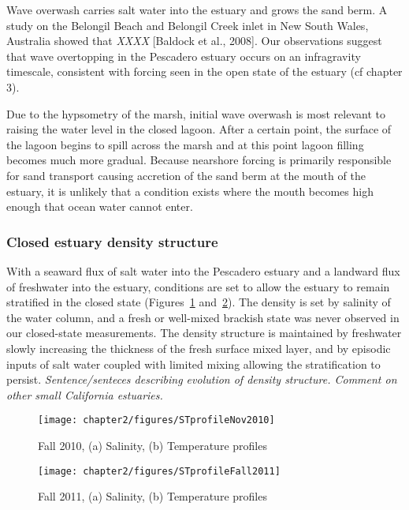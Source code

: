 Wave overwash carries salt water into the estuary and grows the sand berm. A study on the Belongil Beach and Belongil Creek inlet in New South Wales, Australia showed that \emph{XXXX} [Baldock et al., 2008]. Our observations suggest that wave overtopping in the Pescadero 
estuary occurs on an infragravity timescale, consistent with forcing seen in the open state of the estuary (cf chapter 3).

Due to the hypsometry of the marsh, initial wave overwash is most relevant to raising the water level in the closed lagoon. After a certain point, the surface of the lagoon begins to spill across the marsh and at this point lagoon filling becomes much more gradual. Because nearshore forcing is primarily responsible for sand transport causing accretion of the sand berm at the mouth of the estuary, it is unlikely that a condition exists where the mouth becomes high enough that ocean water cannot enter. 


\subsubsection{Closed estuary density structure} \label{cl_strat}

With a seaward flux of salt water into the Pescadero estuary and a landward flux of freshwater into the estuary, conditions are set to allow the estuary to remain stratified in the closed state (Figures~\ref{fig:profNov2010} and~\ref{fig:profFall2011}). The density is set by salinity of the water column, and a fresh or well-mixed brackish state was never observed in our closed-state measurements. The density structure is maintained by freshwater slowly increasing the thickness of the fresh surface mixed layer, and by episodic inputs of salt water coupled with limited mixing allowing the stratification to persist. \emph{Sentence/senteces describing evolution of density structure.  Comment on other small California estuaries.}


\begin{figure}
\centering
	\texttt{[image: chapter2/figures/STprofileNov2010]}
	\caption{Fall 2010, (a) Salinity, (b) Temperature profiles}
	\label{fig:profNov2010}
\end{figure}


\begin{figure}
\centering
	\texttt{[image: chapter2/figures/STprofileFall2011]}
	\caption{Fall 2011, (a) Salinity, (b) Temperature profiles}
\label{fig:profFall2011}
\end{figure}

